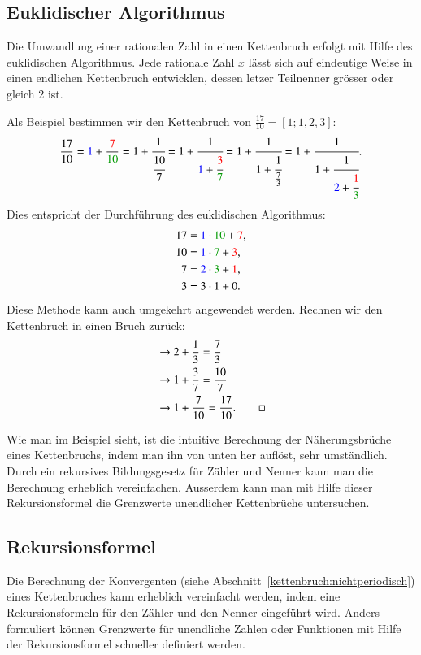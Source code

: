 \subsection{Euklidischer Algorithmus}
Die Umwandlung einer rationalen Zahl in einen Kettenbruch erfolgt
mit Hilfe des euklidischen Algorithmus.
Jede rationale Zahl $x$ lässt sich auf eindeutige Weise in einen
endlichen Kettenbruch entwicklen, dessen letzer Teilnenner grösser
oder gleich 2 ist.
\begin{beispiel}
Als Beispiel bestimmen wir den Kettenbruch von $\frac{17}{10} = [1;1,2,3]$:
\begin{equation}
\frac{17}{10}
=
{\color{blue}1} + \frac{{\color{red}7}}{{\color{darkgreen}10}}
=
1 + \cfrac{1}{\cfrac{10}{7}}
=
1 + \cfrac{1}{{\color{blue}1}+\cfrac{{\color{red}3}}{{\color{darkgreen}7}}}
=
1 + \cfrac{1}{1+\cfrac{1}{\frac{7}{3}}}
=
1 + \cfrac{1}{1+\cfrac{1}{{\color{blue}2}+\cfrac{{\color{red}1}}{{\color{darkgreen}3}}}}.
\end{equation}
Dies entspricht der Durchführung des euklidischen Algorithmus:
\begin{align*}
17 &= {\color{blue}1}\cdot {\color{darkgreen}10} + {\color{red}7}, \\
10 &= {\color{blue}1}\cdot {\color{darkgreen}7} + {\color{red}3}, \\
7 &= {\color{blue}2}\cdot {\color{darkgreen}3} + {\color{red}1}, \\
3 &= 3\cdot 1 + 0.
\end{align*}
Diese Methode kann auch umgekehrt angewendet werden.
Rechnen wir den Kettenbruch in einen Bruch zurück:
\begin{align*}
[1;1,2,3] 	
&\rightarrow 	2 + \frac{1}{3} = \frac{7}{3} \\
&\rightarrow 	1 + \frac{3}{7} = \frac{10}{7} \\
&\rightarrow 	1 + \frac{7}{10} = \frac{17}{10}.
\qedhere
\end{align*}
\end{beispiel}
Wie man im Beispiel sieht, ist die intuitive Berechnung der
Näherungsbrüche eines Kettenbruchs, indem man ihn von unten her
auflöst, sehr umständlich. Durch ein rekursives Bildungsgesetz für
Zähler und Nenner kann man die Berechnung erheblich vereinfachen.
Ausserdem kann man mit Hilfe dieser Rekursionsformel die Grenzwerte
unendlicher Kettenbrüche untersuchen.

\subsection{Rekursionsformel}
Die Berechnung der Konvergenten (siehe
Abschnitt~\ref{kettenbruch:nichtperiodisch}) eines Kettenbruches 
kann erheblich vereinfacht werden, indem eine Rekursionsformeln für den Zähler 
und den Nenner eingeführt wird.
Anders formuliert können Grenzwerte für unendliche 
Zahlen oder Funktionen mit Hilfe der Rekursionsformel schneller definiert
werden.

